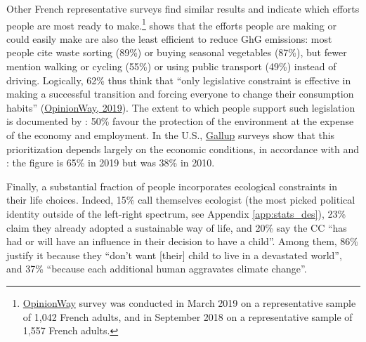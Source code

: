 \documentclass[english,5p,authoryear]{elsarticle}
\begin{document}
Other French representative surveys find similar results and indicate which efforts people are most ready to make.\footnote{\href{http://www.datapressepremium.com/rmdiff/2008572/Etude-OpinionWay-pour-PrimesEnergie.fr.pdf}{OpinionWay} survey was conducted in March 2019 on a representative sample of 1,042 French adults, and \citet{ademe_representations_2018} in September 2018 on a representative sample of 1,557 French adults.} 
\citet{ademe_representations_2018} shows that the efforts people are making or could easily make are also the least efficient to reduce GhG emissions: most people cite waste sorting (89\%) or buying seasonal vegetables (87\%), but fewer mention walking or cycling (55\%) or using public transport (49\%) instead of driving. Logically, 62\% thus think that ``only legislative constraint is effective in making a successful transition and forcing everyone to change their consumption habits'' (\href{http://www.datapressepremium.com/rmdiff/2008572/Etude-OpinionWay-pour-PrimesEnergie.fr.pdf}{OpinionWay, 2019}). The extent to which people support such legislation is documented by \citet{brechon_france_2019}: 50\% favour the protection of the environment at the expense of the economy and employment. In the U.S., \href{https://news.gallup.com/poll/1615/environment.aspx}{Gallup} surveys show that this prioritization depends largely on the economic conditions, in accordance with \citet{brulle_shifting_2012} and \citet{shum_effects_2012}: the figure is 65\% in 2019 but was 38\% in 2010.

Finally, a substantial fraction of people incorporates ecological constraints in their life choices. Indeed, 15\% call themselves ecologist (the most picked political identity outside of the left-right spectrum, see Appendix \ref{app:stats_des}), 23\% claim they already adopted a sustainable way of life, and 20\% say the CC ``has had or will have an influence in their decision to have a child''. Among them, 86\% justify it because they ``don't want [their] child to live in a devastated world'', and 37\% ``because each additional human aggravates climate change''.
\end{document}
